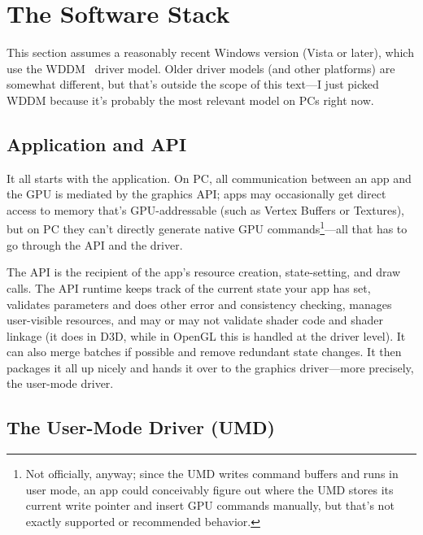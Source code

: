 \chapter{The Software Stack}
\label{ch:swstack}


This section assumes a reasonably recent Windows version (Vista or later),
which use the WDDM~\citep{wddm} driver model. Older driver models (and other
platforms) are somewhat different, but that's outside the scope of this
text---I just picked WDDM because it's probably the most relevant model on
PCs right now.

\section{Application and API}

It all starts with the application. On PC, all communication between an app and
the GPU is mediated by the graphics API; apps may occasionally get direct
access to memory that's GPU-addressable (such as Vertex Buffers or Textures),
but on PC they can't directly generate native GPU commands\footnote{Not
officially, anyway; since the UMD writes command buffers and runs in user mode,
an app could conceivably figure out where the UMD stores its current write
pointer and insert GPU commands manually, but that's not exactly supported or
recommended behavior.}---all that has to go through the API and the driver.

The API is the recipient of the app's resource creation, state-setting, and draw
calls. The API runtime keeps track of the current state your app has set,
validates parameters and does other error and consistency checking, manages
user-visible resources, and may or may not validate shader code and shader
linkage (it does in D3D, while in OpenGL this is handled at the driver level).
It can also merge batches if possible and remove redundant state changes. It 
then packages it all up nicely and hands it over to the graphics driver---more 
precisely, the user-mode driver.

\section{The User-Mode Driver (UMD)}

